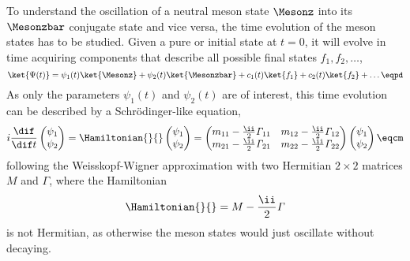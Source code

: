 To understand the oscillation of a neutral meson state $\Mesonz$ into its
$\Mesonzbar$ \CP conjugate state and vice versa, the time evolution of the meson
states has to be studied. Given a pure \Mesonz or \Mesonzbar initial state at
$t=0$, it will evolve in time acquiring components that describe all possible final states $f_1, f_2, \dots$,
%
\begin{equation}
  \ket{\Psi(t)} = \psi_1(t) \ket{\Mesonz} + \psi_2(t) \ket{\Mesonzbar} + c_1(t) \ket{f_1} + c_2(t) \ket{f_2} + \dots \eqpd
\end{equation}
%
As only the parameters $\psi_1(t)$ and $\psi_2(t)$ are of interest, this time
evolution can be described by a Schrödinger-like equation,
%
\begin{equation}
  i \frac{\dif}{\dif t} 
  \begin{pmatrix}
    \psi_1 \\
    \psi_2
  \end{pmatrix}
  =
  \Hamiltonian{}{}
  \begin{pmatrix}
    \psi_1 \\
    \psi_2
  \end{pmatrix}
  =
  \begin{pmatrix}
    m_{11} - \frac{\ii}{2} \mathit{\Gamma}_{11}    & m_{12} - \frac{\ii}{2} \mathit{\Gamma}_{12} \\
    m_{21} - \frac{\ii}{2} \mathit{\Gamma}_{21}    & m_{22} - \frac{\ii}{2} \mathit{\Gamma}_{22} \\
  \end{pmatrix}
  \begin{pmatrix}
    \psi_1 \\
    \psi_2
  \end{pmatrix}\eqcm
\end{equation}
%
following the Weisskopf-Wigner approximation
\cite{Weisskopf:1930au,Weisskopf:1930ps} with two Hermitian $2\times2$ matrices
$M$ and $\mathit{\Gamma}$, where the Hamiltonian
%
\begin{equation}
  \Hamiltonian{}{} = M - \frac{\ii}{2} \mathit{\Gamma}
\end{equation}
%
is not Hermitian, as otherwise the meson states would just oscillate without
decaying.


